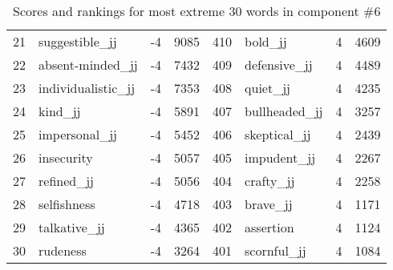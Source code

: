 \begin{table}[tbp]
\begin{tabular}{| rlr@{.}l | rlr@{.}l |}
    21 & suggestible\_jj & -4 & 9085    &    410 & bold\_jj & 4 & 4609 \\
    22 & absent-minded\_jj & -4 & 7432    &    409 & defensive\_jj & 4 & 4489 \\
    23 & individualistic\_jj & -4 & 7353    &    408 & quiet\_jj & 4 & 4235 \\
    24 & kind\_jj & -4 & 5891    &    407 & bullheaded\_jj & 4 & 3257 \\
    25 & impersonal\_jj & -4 & 5452    &    406 & skeptical\_jj & 4 & 2439 \\
    26 & insecurity & -4 & 5057    &    405 & impudent\_jj & 4 & 2267 \\
    27 & refined\_jj & -4 & 5056    &    404 & crafty\_jj & 4 & 2258 \\
    28 & selfishness & -4 & 4718    &    403 & brave\_jj & 4 & 1171 \\
    29 & talkative\_jj & -4 & 4365    &    402 & assertion & 4 & 1124 \\
    30 & rudeness & -4 & 3264    &    401 & scornful\_jj & 4 & 1084 \\
    \hline
    \end{tabular}
    \caption{Scores and rankings for most extreme 30 words in component \#6} 
\end{table}
\clearpage
